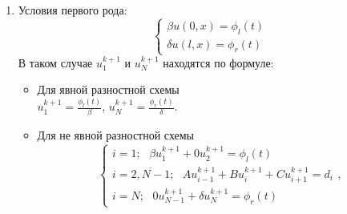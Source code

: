 \documentclass[12pt]{article}
\begin{document}
    \begin{enumerate}
        \item Условия первого рода:
            \begin{equation*}
                \begin{cases}
                    \beta u(0,x) = \phi_l(t)
                    \\
                    \delta u(l,x) = \phi_r(t)
                \end{cases}
            \end{equation*}
            В таком случае $u_1^{k+1}$ и $u_N^{k+1}$ находятся по формуле:
            \begin{itemize}
                \item Для явной разностной схемы\\
                $u_1^{k+1}=\frac{\phi_l(t)}{\beta}$, $u_N^{k+1}=\frac{\phi_r(t)}{\delta}$.
                \item Для не явной разностной схемы\\
                \begin{equation*}
                    \begin{cases}
                        i=1;\:\:\: \beta u_1^{k+1} +0u_{2}^{k+1}=\phi_l(t)
                        \\
                        i=\overline{2,N-1};\:\:\:Au_{i-1}^{k+1} + Bu_i^{k+1} +Cu_{i+1}^{k+1}=d_i
                        \\
                        i=N;\:\:\: 0u_{N-1}^{k+1} + \delta u_N^{k+1} = \phi_r(t)
                    \end{cases},
                \end{equation*}
            \end{itemize}


\end{enumerate}
\end{document}
